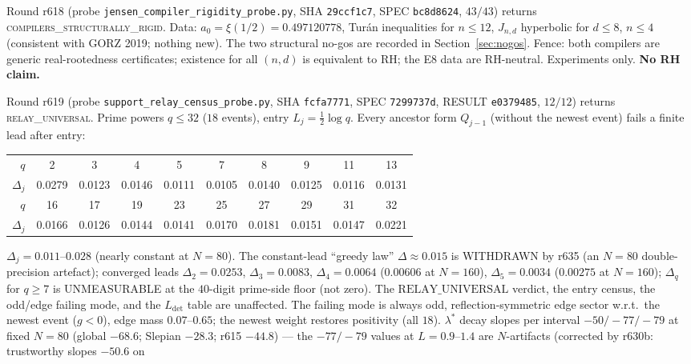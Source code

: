 \documentclass[11pt]{article}
\theoremstyle{definition}
\theoremstyle{remark}
\begin{document}
\noindent Round r618 (probe \texttt{jensen\_compiler\_rigidity\_probe.py},
SHA \texttt{29ccf1c7}, SPEC \texttt{bc8d8624}, $43/43$) returns
\textsc{compilers\_structurally\_rigid}.  Data:
$a_0=\xi(1/2)=0.497120778$, Tur\'an inequalities for $n\le 12$,
$J_{n,d}$ hyperbolic for $d\le 8$, $n\le 4$ (consistent with
GORZ 2019; nothing new).  The two structural no-gos are recorded in
Section~\ref{sec:nogos}.  Fence: both compilers are generic
real-rootedness certificates; existence for all $(n,d)$ is equivalent
to RH; the E8 data are RH-neutral.  Experiments only.
\textbf{No RH claim.}

\noindent Round r619 (probe \texttt{support\_relay\_census\_probe.py},
SHA \texttt{fcfa7771}, SPEC \texttt{7299737d}, RESULT
\texttt{e0379485}, $12/12$) returns \textsc{relay\_universal}.
Prime powers $q\le 32$ ($18$ events), entry
$L_j=\tfrac12\log q$.  Every ancestor form $Q_{j-1}$ (without
the newest event) fails a finite lead after entry:
\begin{center}\small
\begin{tabular}{@{}rccccccccc@{}}
\toprule
$q$ & 2 & 3 & 4 & 5 & 7 & 8 & 9 & 11 & 13\\
$\Delta_j$ & 0.0279 & 0.0123 & 0.0146 & 0.0111 & 0.0105 & 0.0140 & 0.0125 & 0.0116 & 0.0131\\
\midrule
$q$ & 16 & 17 & 19 & 23 & 25 & 27 & 29 & 31 & 32\\
$\Delta_j$ & 0.0166 & 0.0126 & 0.0144 & 0.0141 & 0.0170 & 0.0181 & 0.0151 & 0.0147 & 0.0221\\
\bottomrule
\end{tabular}
\end{center}
$\Delta_j=0.011$--$0.028$ (nearly constant at $N=80$).
The constant-lead ``greedy law'' $\Delta\approx 0.015$ is
WITHDRAWN by r635 (an $N=80$ double-precision artefact);
converged leads $\Delta_2=0.0253$, $\Delta_3=0.0083$,
$\Delta_4=0.0064$ ($0.00606$ at $N=160$), $\Delta_5=0.0034$
($0.00275$ at $N=160$); $\Delta_q$ for $q\ge 7$ is
UNMEASURABLE at the $40$-digit prime-side floor (not zero).
The $\mathrm{RELAY\_UNIVERSAL}$ verdict, the entry census,
the odd/edge failing mode, and the $L_{\mathrm{det}}$ table
are unaffected.  The failing mode
is always odd, reflection-symmetric edge sector w.r.t.\ the
newest event ($g<0$), edge mass $0.07$--$0.65$; the newest
weight restores positivity (all $18$).  $\lambda^*$ decay
slopes per interval $-50/-77/-79$ at fixed $N=80$
(global $-68.6$; Slepian $-28.3$; r615 $-44.8$) --- the
$-77/-79$ values at $L=0.9$--$1.4$ are $N$-artifacts
(corrected by r630b: trustworthy slopes $-50.6$ on
\end{document}
